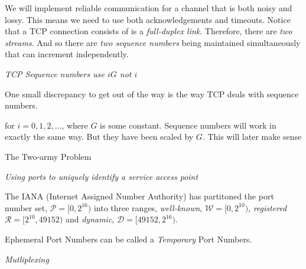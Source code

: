 We will implement reliable communication for a channel that is both noisy and lossy. 
This means we need to use both acknowledgements and timeouts. 
Notice that a TCP connection consists of is a \textit{full-duplex link}. 
Therefore, there are \textit{two streams}. And so there are \textit{two sequence numbers}
being maintained simultaneously that can increment independently. 

\frmrule

\textit{TCP Sequence numbers use $iG$ not $i$ } 

One small discrepancy to get out of the way is the way TCP deals with sequence numbers. 


for $i = 0,1,2,...$, where $G$ is some constant. 
Sequence numbers will work in exactly the same way. But they have been 
scaled by $G$. This will later make sense


\begin{sidenote}{The Two-army Problem}

\end{sidenote}


\frmrule 

\textit{Using ports to uniquely identify a service access point }


The IANA (Internet Assigned Number Authority) has partitoned the port number set, $\mathcal{P} = [0, 2^{16})$ 
into three ranges, \textit{well-known}, $\mathcal{W} = [0,2^{10})$, \textit{registered} $\mathcal{R}=[2^{10},49152)$ 
and \emph{dynamic}, $\mathcal{D} = [49152,2^{16})$. 


Ephemeral Port Numbers can be called a \textit{Temporary} Port Numbers. 


\frmrule 

\textit{Mutliplexing}
